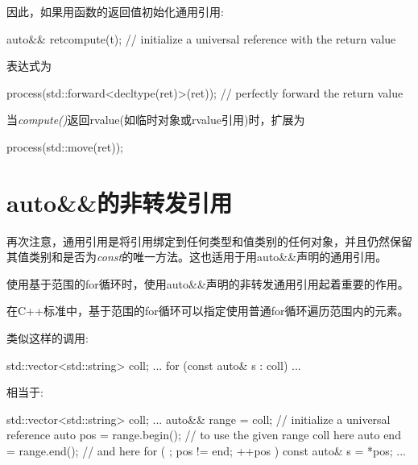 因此，如果用函数的返回值初始化通用引用:\par

\begin{codebox}[cpp]
auto&& ret{compute(t)}; // initialize a universal reference with the return value
\end{codebox}

表达式为\par

\begin{codebox}[cpp]
process(std::forward<decltype(ret)>(ret)); // perfectly forward the return value
\end{codebox}

当\textit{compute()}返回rvalue(如临时对象或rvalue引用)时，扩展为\par

\begin{codebox}[cpp]
process(std::move(ret));
\end{codebox}


\section{auto\&\&的非转发引用}

再次注意，通用引用是将引用绑定到任何类型和值类别的任何对象，并且仍然保留其值类别和是否为\textit{const}的唯一方法。这也适用于用auto\&\&声明的通用引用。\par


使用基于范围的for循环时，使用auto\&\&声明的非转发通用引用起着重要的作用。\par


在C++标准中，基于范围的for循环可以指定使用普通for循环遍历范围内的元素。\par

类似这样的调用:\par

\begin{codebox}[cpp]
std::vector<std::string> coll;
...
for (const auto& s : coll) {
  ...
}
\end{codebox}

相当于:\par

\begin{codebox}[cpp]
std::vector<std::string> coll;
...
auto&& range = coll; // initialize a universal reference
auto pos = range.begin(); // to use the given range coll here
auto end = range.end(); // and here
for ( ; pos != end; ++pos ) {
  const auto& s = *pos;
  ...
}
\end{codebox}

